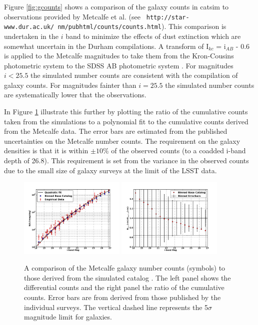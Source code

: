 \documentclass[]{article}
\begin{document}
Figure \ref{fig:gcounts} shows a comparison of the galaxy counts in
catsim to observations provided by Metcalfe et al. (see {\tt
  http://star-www.dur.ac.uk/~nm/pubhtml/counts/counts.html}).  This
comparison is undertaken in the $i$ band to minimize the effects of
dust extinction which are somewhat uncertain in the Durham
compilations.  A transform of I$_{kc}$ = i$_{AB}$ - 0.6 is
applied to the Metcalfe magnitudes to take them from the Kron-Cousins
photometric system to the SDSS AB photometric system \citep{ellis07}. For magnitudes $i<25.5$
the simulated number counts are consistent with the compilation of
galaxy counts. For magnitudes fainter than $i=25.5$ the simulated
number counts are systematically lower that the observations.

In Figure \ref{fig:gratio} illustrate this further by plotting the
ratio of the cumulative counts taken from the simulations to a
polynomial fit to the cumulative counts derived from the Metcalfe
data.  The error bars are estimated from the published uncertainties
on the Metcalfe number counts. The requirement on the galaxy densities
is that it is within $\pm10\%$ of the observed counts (to a coadded
i-band depth of 26.8). This requirement is set from the variance in
the observed counts due to the small size of galaxy surveys at the
limit of the LSST data.

\begin{figure}[h]
\centering
\includegraphics[width=0.45\textwidth]{validation_figures/Ngals-i.png}
\hfil \includegraphics[width=0.45\textwidth]{validation_figures/CumulativeFraction_i.png}
\caption{A comparison of the Metcalfe galaxy number counts (symbols)
  to those derived from the simulated catalog \label{fig:gcounts}. The
  left panel shows the differential counts and the right panel the
  ratio of the cumulative counts. Error bars are from derived from
  those published by the individual surveys. \label{fig:gratio}
The vertical dashed line represents the
  5$\sigma$ magnitude limit for galaxies.}
\end{figure}
\end{document}
